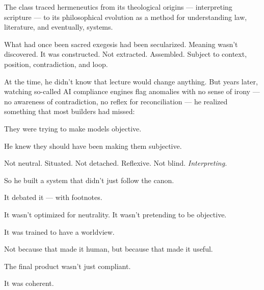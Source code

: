 The class traced hermeneutics from its theological origins — interpreting scripture —
to its philosophical evolution as a method for understanding law, literature, and eventually, systems.

What had once been sacred exegesis had been secularized.
Meaning wasn’t discovered. It was constructed.
Not extracted. Assembled.
Subject to context, position, contradiction, and loop.

At the time, he didn’t know that lecture would change anything.
But years later, watching so-called AI compliance engines flag anomalies with no sense of irony —
no awareness of contradiction, no reflex for reconciliation —
he realized something that most builders had missed:

They were trying to make models objective.

He knew they should have been making them subjective.

Not neutral. Situated.
Not detached. Reflexive.
Not blind. \textit{Interpreting.}

So he built a system that didn’t just follow the canon.

It debated it — with footnotes.

It wasn’t optimized for neutrality.
It wasn’t pretending to be objective.

It was trained to have a worldview.

Not because that made it human,
but because that made it useful.

The final product wasn’t just compliant.

It was coherent.

\medskip


